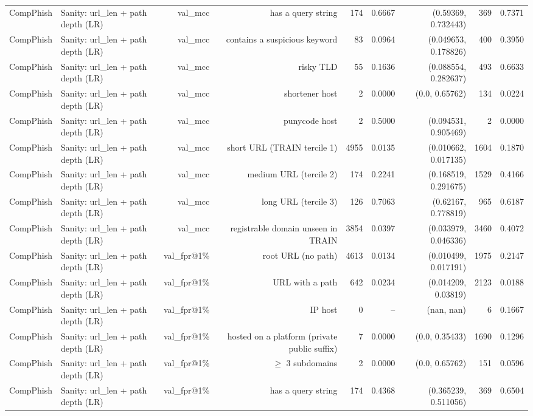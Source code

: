 \begin{table}[t]
\begin{tabular}{llrrrrrrr}
CompPhish & Sanity: url\_len + path depth (LR) & val\_mcc & has a query string & 174 & 0.6667 & (0.59369, 0.732443) & 369 & 0.7371 \\
CompPhish & Sanity: url\_len + path depth (LR) & val\_mcc & contains a suspicious keyword & 83 & 0.0964 & (0.049653, 0.178826) & 400 & 0.3950 \\
CompPhish & Sanity: url\_len + path depth (LR) & val\_mcc & risky TLD & 55 & 0.1636 & (0.088554, 0.282637) & 493 & 0.6633 \\
CompPhish & Sanity: url\_len + path depth (LR) & val\_mcc & shortener host & 2 & 0.0000 & (0.0, 0.65762) & 134 & 0.0224 \\
CompPhish & Sanity: url\_len + path depth (LR) & val\_mcc & punycode host & 2 & 0.5000 & (0.094531, 0.905469) & 2 & 0.0000 \\
CompPhish & Sanity: url\_len + path depth (LR) & val\_mcc & short URL (TRAIN tercile 1) & 4955 & 0.0135 & (0.010662, 0.017135) & 1604 & 0.1870 \\
CompPhish & Sanity: url\_len + path depth (LR) & val\_mcc & medium URL (tercile 2) & 174 & 0.2241 & (0.168519, 0.291675) & 1529 & 0.4166 \\
CompPhish & Sanity: url\_len + path depth (LR) & val\_mcc & long URL (tercile 3) & 126 & 0.7063 & (0.62167, 0.778819) & 965 & 0.6187 \\
CompPhish & Sanity: url\_len + path depth (LR) & val\_mcc & registrable domain unseen in TRAIN & 3854 & 0.0397 & (0.033979, 0.046336) & 3460 & 0.4072 \\
CompPhish & Sanity: url\_len + path depth (LR) & val\_fpr@1\% & root URL (no path) & 4613 & 0.0134 & (0.010499, 0.017191) & 1975 & 0.2147 \\
CompPhish & Sanity: url\_len + path depth (LR) & val\_fpr@1\% & URL with a path & 642 & 0.0234 & (0.014209, 0.03819) & 2123 & 0.0188 \\
CompPhish & Sanity: url\_len + path depth (LR) & val\_fpr@1\% & IP host & 0 & -- & (nan, nan) & 6 & 0.1667 \\
CompPhish & Sanity: url\_len + path depth (LR) & val\_fpr@1\% & hosted on a platform (private public suffix) & 7 & 0.0000 & (0.0, 0.35433) & 1690 & 0.1296 \\
CompPhish & Sanity: url\_len + path depth (LR) & val\_fpr@1\% & $\geq$ 3 subdomains & 2 & 0.0000 & (0.0, 0.65762) & 151 & 0.0596 \\
CompPhish & Sanity: url\_len + path depth (LR) & val\_fpr@1\% & has a query string & 174 & 0.4368 & (0.365239, 0.511056) & 369 & 0.6504 \\

\end{tabular}
\end{table}
